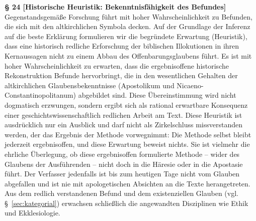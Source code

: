\documentclass[11pt,a4paper]{article}
\makeatletter
\newcommand{\apthsec}[3]{%
  \phantomsection%
  \def\@currentlabel{#1}%
  \label{sec:#3}%
  \textbf{§ #1 [#2]}%
}
\makeatother
\begin{document}
\apthsec{24}{Historische Heuristik: Bekenntnisfähigkeit des Befundes}{heuristik-befund} Gegenstandsgemäße Forschung führt mit hoher Wahrscheinlichkeit zu Befunden, die sich mit den altkirchlichen Symbola decken. Auf der Grundlage der Inferenz auf die beste Erklärung formulieren wir die begründete Erwartung (Heuristik), dass eine historisch redliche Erforschung der biblischen Illokutionen in ihren Kernaussagen nicht zu einem Abbau des Offenbarungsglaubens führt. Es ist mit hoher Wahrscheinlichkeit zu erwarten, dass die ergebnisoffene historische Rekonstruktion Befunde hervorbringt, die in den wesentlichen Gehalten der altkirchlichen Glaubensbekenntnisse (Apostolikum und Nicaeno-Constantinopolitanum) abgebildet sind. Diese Übereinstimmung wird nicht dogmatisch erzwungen, sondern ergibt sich als rational erwartbare Konsequenz einer geschichtswissenschaftlich redlichen Arbeit am Text. Diese Heuristik ist ausdrücklich nur ein Ausblick und darf nicht als Zirkelschluss missverstanden werden, der das Ergebnis der Methode vorwegnimmt: Die Methode selbst bleibt jederzeit ergebnisoffen, und diese Erwartung beweist nichts. Sie ist vielmehr die ehrliche Überlegung, ob diese ergebnisoffen formulierte Methode – wider des Glaubens der Ausführenden – nicht doch in die Häresie oder in die Apostasie führt. Der Verfasser jedenfalls ist bis zum heutigen Tage nicht vom Glauben abgefallen und ist nie mit apologetischen Absichten an die Texte herangetreten. Aus dem redlich verstandenen Befund und dem existenziellen Glauben (vgl. §~\ref{sec:kategorial}) erwachsen schließlich die angewandten Disziplinen wie Ethik und Ekklesiologie.
\end{document}
